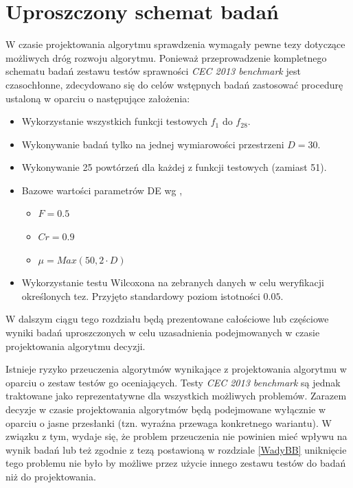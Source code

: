 \documentclass[12pt,a4paper]{report}
\begin{document}
{{{{{{\section{Uproszczony schemat badań}
\label{StandardParamsSimple}
\par{
W czasie projektowania algorytmu sprawdzenia wymagały pewne tezy dotyczące możliwych dróg rozwoju algorytmu. Ponieważ przeprowadzenie kompletnego schematu badań zestawu testów sprawności \emph{CEC 2013 benchmark} jest czasochłonne, zdecydowano się do celów wstępnych badań zastosować procedurę ustaloną w oparciu o następujące założenia:
\begin{itemize}
\item Wykorzystanie wszystkich funkcji testowych $f_1$ do $f_{28}$.
\item Wykonywanie badań tylko na jednej wymiarowości przestrzeni $D = 30$.
\item Wykonywanie 25 powtórzeń dla każdej z funkcji testowych (zamiast 51).
\item Bazowe wartości parametrów DE wg \cite{CEC2013DEbasic},
\begin{itemize}
\item $F = 0.5$
\item $Cr = 0.9$
\item $\mu = Max(50, 2 \cdot D)$
\end{itemize}
\item Wykorzystanie testu Wilcoxona na zebranych danych w celu weryfikacji określonych tez. Przyjęto standardowy poziom istotności $0.05$.
\end{itemize}
}

\par{
W dalszym ciągu tego rozdziału będą prezentowane całościowe lub częściowe wyniki badań uproszczonych w celu uzasadnienia podejmowanych w czasie projektowania algorytmu decyzji.
\par{
Istnieje ryzyko przeuczenia algorytmów wynikające z projektowania algorytmu w oparciu o zestaw testów go oceniających. Testy \emph{CEC 2013 benchmark} są jednak traktowane jako reprezentatywne dla wszystkich możliwych problemów. Zarazem decyzje w czasie projektowania algorytmów będą podejmowane wyłącznie w oparciu o jasne przesłanki (tzn. wyraźna przewaga konkretnego wariantu). W związku z tym, wydaje się, że problem przeuczenia nie powinien mieć wpływu na wynik badań lub też zgodnie z tezą postawioną w rozdziale \ref{WadyBB} uniknięcie tego problemu nie było by możliwe przez użycie innego zestawu testów do badań niż do projektowania.
}

}}}}}}}
\end{document}
